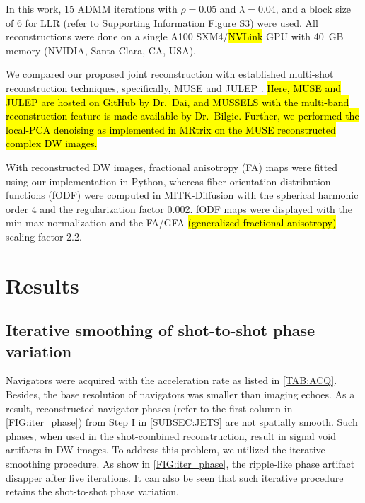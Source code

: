\documentclass[preprint,12pt,authoryear,review]{elsarticle}
\begin{document}
    In this work, 15 ADMM iterations with $\rho = 0.05$ and $\lambda = 0.04$,
    and a block size of 6 for LLR (refer to Supporting Information Figure S3)
    were used.
    All reconstructions were done on a single A100 SXM4/\hl{NVLink} GPU 
    with \SI{40}{GB} memory (NVIDIA, Santa Clara, CA, USA).

    We compared our proposed joint reconstruction
    with established multi-shot reconstruction techniques,
    specifically, MUSE \citep{chen_2013_muse}
    and JULEP \citep{dai_2023_julep}.
    \hl{Here, MUSE and JULEP are hosted on GitHub by Dr.~Dai,
    and MUSSELS with the multi-band reconstruction feature
    is made available by Dr.~Bilgic.
    Further, we performed
    the local-PCA denoising \mbox{\citep{cordero_2019_cplxdwi}}
    as implemented in MRtrix \mbox{\citep{Tournier_2019_mrtrix}}
    on the MUSE reconstructed complex DW images.}

    With reconstructed DW images, fractional anisotropy (FA) maps
    \citep{basser_1994_dmri} were fitted using our implementation in Python,
    whereas fiber orientation distribution functions (fODF)
    \citep{aganj_2009_solidangle}
    were computed in MITK-Diffusion \citep{fritzsche_2012_mitk_diff}
    with the spherical harmonic order \num{4} and the regularization factor \num{0.002}.
    fODF maps were displayed with the min-max normalization
    and the FA/GFA \hl{(generalized fractional anisotropy)}
    scaling factor \num{2.2}.

    \pagebreak

    \section{Results}
    \label{SEC_Resl}

    \subsection{Iterative smoothing of shot-to-shot phase variation}

    Navigators were acquired with the acceleration rate
    as listed in \cref{TAB:ACQ}.
    Besides, the base resolution of navigators
    was smaller than imaging echoes.
    As a result, reconstructed navigator phases
    (refer to the first column in \cref{FIG:iter_phase})
    from Step I in \cref{SUBSEC:JETS}
    are not spatially smooth.
    Such phases, when used in the shot-combined reconstruction,
    result in signal void artifacts in DW images.
    To address this problem, we utilized the iterative smoothing procedure.
    As show in \cref{FIG:iter_phase},
    the ripple-like phase artifact disapper after five iterations.
    It can also be seen that such iterative procedure retains
    the shot-to-shot phase variation.
\end{document}
